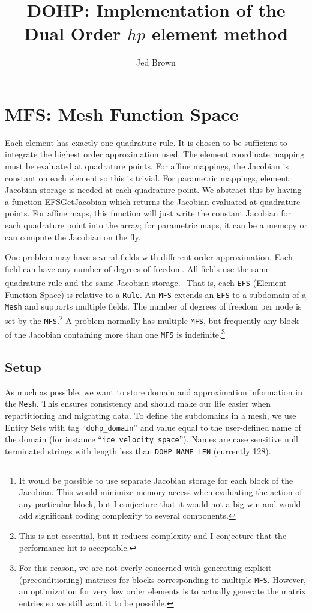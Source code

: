 \documentclass[a4paper]{article}
\title{DOHP: Implementation of the Dual Order $hp$ element method}
\author{Jed Brown}
\newcommand{\struct}[1]{\texttt{#1}}
\newcommand{\trl}[1]{\texttt{#1}}
\begin{document}
\maketitle

\section{MFS: Mesh Function Space}
Each element has exactly one quadrature rule.  It is chosen to be sufficient to integrate the highest order
approximation used.  The element coordinate mapping must be evaluated at quadrature points.  For affine mappings, the
Jacobian is constant on each element so this is trivial.  For parametric mappings, element Jacobian storage is needed at
each quadrature point.  We abstract this by having a function EFSGetJacobian which returns the Jacobian evaluated at
quadrature points.  For affine maps, this function will just write the constant Jacobian for each quadrature point into
the array; for parametric maps, it can be a memcpy or can compute the Jacobian on the fly.

One problem may have several fields with different order approximation.  Each field can have any number of degrees of
freedom.  All fields use the same quadrature rule and the same Jacobian storage.\footnote{It would be possible to use
  separate Jacobian storage for each block of the Jacobian.  This would minimize memory access when evaluating the
  action of any particular block, but I conjecture that it would not a big win and would add significant coding
  complexity to several components.}  That is, each \trl{EFS} (Element Function Space) is relative to a \struct{Rule}.
An \trl{MFS} extends an \trl{EFS} to a subdomain of a \trl{Mesh} and supports multiple fields.  The number of degrees of
freedom per node is set by the \trl{MFS}.\footnote{This is not essential, but it reduces complexity and I conjecture
  that the performance hit is acceptable.}  A problem normally has multiple \trl{MFS}, but frequently any block of the
Jacobian containing more than one \trl{MFS} is indefinite.\footnote{For this reason, we are not overly concerned with
  generating explicit (preconditioning) matrices for blocks corresponding to multiple \trl{MFS}.  However, an
  optimization for very low order elements is to actually generate the matrix entries so we still want it to be
  possible.}

\subsection{Setup}
As much as possible, we want to store domain and approximation information in the \trl{Mesh}.  This ensures consistency
and should make our life easier when repartitioning and migrating data.  To define the subdomains in a mesh, we use
Entity Sets with tag ``\trl{dohp\_domain}'' and value equal to the user-defined name of the domain (for instance
``\trl{ice velocity space}'').  Names are case sensitive null terminated strings with length less than
\trl{DOHP\_NAME\_LEN} (currently 128).
\end{document}
